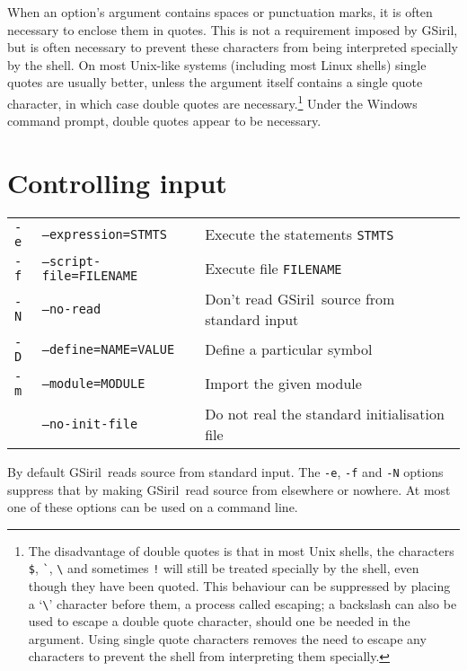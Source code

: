 \documentclass[a4paper,11pt,oneside]{book}
\def\gsiril{GSiril}
\begin{document}
When an option's argument contains spaces or punctuation marks, it is often
necessary to enclose them in quotes.  This is not a requirement imposed by
\gsiril, but is often necessary to prevent these characters from being
interpreted specially by the shell.
On most Unix-like systems (including most Linux shells) single quotes are
usually better, unless the argument itself contains a single quote character,
in which case double quotes are necessary.\footnote{The disadvantage of double
quotes is that in most Unix shells, the characters \verb+$+, \verb+`+,
\verb+\+ and sometimes \verb+!+ will still be treated specially by the shell,
even though they have been quoted.  This behaviour can be suppressed by
placing a `\verb+\+' character before them, a process called escaping;
a backslash can also be used to escape a double quote character, should one be
needed in the argument.
Using single quote characters removes the need to escape any characters to
prevent the shell from interpreting them specially.} 
Under the Windows command prompt, double quotes appear to be necessary.


\section{Controlling input}
\label{inputopts}

\begin{tabularx}{\textwidth}{llX}
\texttt{-e}&\texttt{--expression=STMTS}&
  Execute the statements \texttt{STMTS}\\
\texttt{-f}&\texttt{--script-file=FILENAME}&
  Execute file \texttt{FILENAME}\\
\texttt{-N}&\texttt{--no-read}&
  Don't read \gsiril\ source from standard input\\
\texttt{-D}&\texttt{--define=NAME=VALUE}&
  Define a particular symbol\\
\texttt{-m}&\texttt{--module=MODULE}&
  Import the given module\\
&\texttt{--no-init-file}&
  Do not real the standard initialisation file
\end{tabularx}

By default \gsiril\ reads source from standard input.
The \verb+-e+, \verb+-f+ and \verb+-N+ options suppress that by making
\gsiril\ read source from elsewhere or nowhere.  At most one of these options
can be used on a command line.
\end{document}
